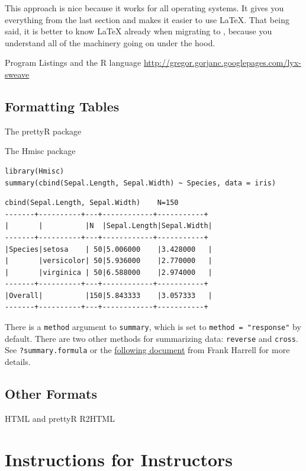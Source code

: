 \documentclass[captions=tableheading]{scrbook}
\begin{document}
This approach is nice because it works for all operating  systems. It gives you everything from the last section and makes it easier to use \LaTeX{}. That being said, it is better to know \LaTeX{} already when migrating to \LyX{}, because you understand all of the machinery going on under the hood.

Program Listings and the \textsf{R} language
\href{http://gregor.gorjanc.googlepages.com/lyx-sweave}{http://gregor.gorjanc.googlepages.com/lyx-sweave}
\section{Formatting Tables \label{sec:Formatting-Tables}}
\label{sec-22-3}


The prettyR package 

The Hmisc package


\begin{verbatim}
library(Hmisc)
summary(cbind(Sepal.Length, Sepal.Width) ~ Species, data = iris)
\end{verbatim}


\begin{verbatim}
cbind(Sepal.Length, Sepal.Width)    N=150
-------+----------+---+------------+-----------+
|       |          |N  |Sepal.Length|Sepal.Width|
-------+----------+---+------------+-----------+
|Species|setosa    | 50|5.006000    |3.428000   |
|       |versicolor| 50|5.936000    |2.770000   |
|       |virginica | 50|6.588000    |2.974000   |
-------+----------+---+------------+-----------+
|Overall|          |150|5.843333    |3.057333   |
-------+----------+---+------------+-----------+
\end{verbatim}

There is a \texttt{method} argument to \texttt{summary}, which is set to \texttt{method = "response"} by default. There are two other methods for summarizing data: \texttt{reverse} and \texttt{cross}. See \texttt{?summary.formula} or the \href{http://biostat.mc.vanderbilt.edu/twiki/bin/view/Main/StatReport}{following document} from Frank Harrell for more details.
\section{Other Formats}
\label{sec-22-4}

\label{sec:Other-Formats}

HTML and prettyR
R2HTML
\chapter{Instructions for Instructors}
\label{sec-23}
\end{document}
